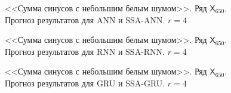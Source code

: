 \documentclass[specialist,
               substylefile = spbu.rtx,
               subf,href,colorlinks=true, 12p]{disser}
\begin{document}
\begin{figure}[H]
	\captionsetup{justification=centering}
	\caption{<<Сумма синусов с небольшим белым шумом>>. Ряд $\mathsf{X}_{650}$. Прогноз результатов для ANN и SSA-ANN. $r = 4$}
\end{figure}

\begin{figure}[H]
	\captionsetup{justification=centering}
	\caption{<<Сумма синусов с небольшим белым шумом>>. Ряд $\mathsf{X}_{650}$. Прогноз результатов для RNN и SSA-RNN. $r = 4$}
	\label{edsin0.3r_r4_res_rnn}
\end{figure}

\begin{figure}[H]
	\captionsetup{justification=centering}
	\caption{<<Сумма синусов с небольшим белым шумом>>. Ряд $\mathsf{X}_{650}$. Прогноз результатов для GRU и SSA-GRU. $r = 4$}
	\label{edsin0.3r_r4_res_gru}
\end{figure}
\end{document}
